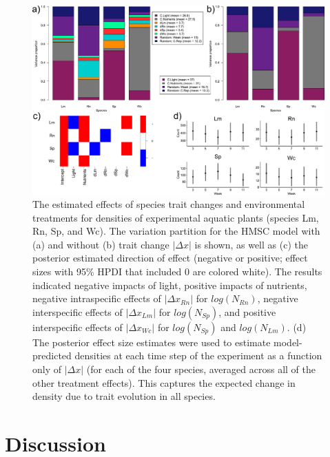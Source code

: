 \documentclass[
]{article}
\begin{document}
\begin{figure}

{\centering \includegraphics[width=1.1\linewidth]{../output/fig3} 

}

\caption{The estimated effects of species trait changes and environmental treatments for densities of experimental aquatic plants (species Lm, Rn, Sp, and Wc). The variation partition for the HMSC model with (a) and without (b) trait change $|\Delta x|$ is shown, as well as (c) the posterior estimated direction of effect (negative or positive; effect sizes with 95\% HPDI that included 0 are colored white). The results indicated negative impacts of light, positive impacts of nutrients, negative intraspecific effects of $|\Delta x_{Rn}|$ for $log(N_{Rn})$, negative interspecific effects of $|\Delta x_{Lm}|$ for $log(N_{Sp})$, and positive interspecific effects of $|\Delta x_{Wc}|$ for $log(N_{Sp})$ and $log(N_{Lm})$. (d) The posterior effect size estimates were used to estimate model-predicted densities at each time step of the experiment as a function only of $|\Delta x|$ (for each of the four species, averaged across all of the other treatment effects). This captures the expected change in density due to trait evolution in all species.}\label{fig:fig3}
\end{figure}

\hypertarget{discussion}{%
\section{Discussion}\label{discussion}}
\end{document}
